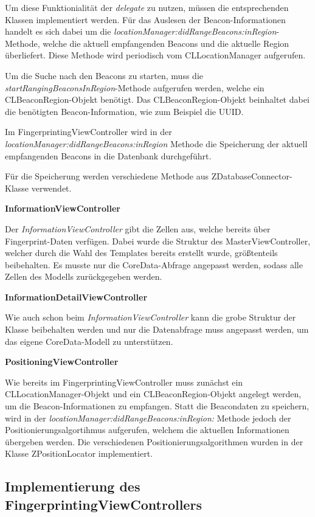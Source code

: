 Um diese Funktionialität der \emph{delegate} zu nutzen, müssen die entsprechenden Klassen implementiert werden. Für das Auslesen der Beacon-Informationen handelt es sich dabei um die \emph{locationManager:didRangeBeacons:inRegion}-Methode, welche die aktuell empfangenden Beacons und die aktuelle Region überliefert. Diese Methode wird periodisch vom CLLocationManager aufgerufen.

Um die Suche nach den Beacons zu starten, muss die \emph{startRangingBeaconsInRegion}-Methode aufgerufen werden, welche ein CLBeaconRegion-Objekt benötigt.
Das CLBeaconRegion-Objekt beinhaltet dabei die benötigten Beacon-Information, wie zum Beispiel die UUID.

Im FingerprintingViewController wird in der \emph{locationManager:didRangeBeacons:inRegion} Methode die Speicherung der aktuell empfangenden Beacons in die Datenbank durchgeführt.

Für die Speicherung werden verschiedene Methode aus ZDatabaseConnector-Klasse verwendet.

\textbf{InformationViewController}

Der \emph{InformationViewController} gibt die Zellen aus, welche bereits über Fingerprint-Daten verfügen. Dabei wurde die Struktur des MasterViewController, welcher durch die Wahl des Templates bereits erstellt wurde, größtenteils beibehalten. Es musste nur die CoreData-Abfrage angepasst werden, sodass alle Zellen des Modells zurückgegeben werden.


\textbf{InformationDetailViewController}

Wie auch schon beim \emph{InformationViewController} kann die grobe Struktur der Klasse beibehalten werden und nur die Datenabfrage muss angepasst werden, um das eigene CoreData-Modell zu unterstützen.


\textbf{PositioningViewController}

Wie bereits im FingerprintingViewController muss zunächst ein CLLocationManager-Objekt und ein CLBeaconRegion-Objekt angelegt werden, um die Beacon-Informationen zu empfangen.
Statt die Beacondaten zu speichern, wird in der \emph{locationManager:didRangeBeacons:inRegion:} Methode jedoch der Positionierungsalgortihmus aufgerufen, welchem die aktuellen Informationen übergeben werden. 
Die verschiedenen Positionierungsalgorithmen wurden in der Klasse ZPositionLocator implementiert.


\subsection{Implementierung des FingerprintingViewControllers}
\label{sec:}


